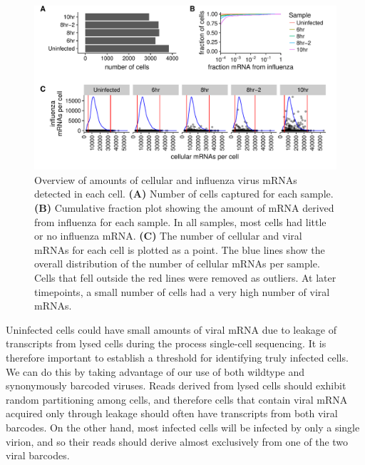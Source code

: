 \documentclass[9pt,lineno]{elife}
\begin{document}
\begin{figure}
\includegraphics[width=\linewidth]{figures/p_cell_mRNA_summary.pdf}
\caption{\label{fig:cells}
Overview of amounts of cellular and influenza virus mRNAs detected in each cell.
{\bf (A)} 
Number of cells captured for each sample.
{\bf (B)} 
Cumulative fraction plot showing the amount of mRNA derived from influenza for each sample.
In all samples, most cells had little or no influenza mRNA.
{\bf (C)} 
The number of cellular and viral mRNAs for each cell is plotted as a point.
The blue lines show the overall distribution of the number of cellular mRNAs per sample.
Cells that fell outside the red lines were removed as outliers.
At later timepoints, a small number of cells had a very high number of viral mRNAs.
}
\end{figure}

Uninfected cells could have small amounts of viral mRNA due to leakage of transcripts from lysed cells during the process single-cell sequencing.
It is therefore important to establish a threshold for identifying truly infected cells.
We can do this by taking advantage of our use of both wildtype and synonymously barcoded viruses.
Reads derived from lysed cells should exhibit random partitioning among cells, and therefore cells that contain viral mRNA acquired only through leakage should often have transcripts from both viral barcodes.
On the other hand, most infected cells will be infected by only a single virion, and so their reads should derive almost exclusively from one of the two viral barcodes. 
\end{document}
